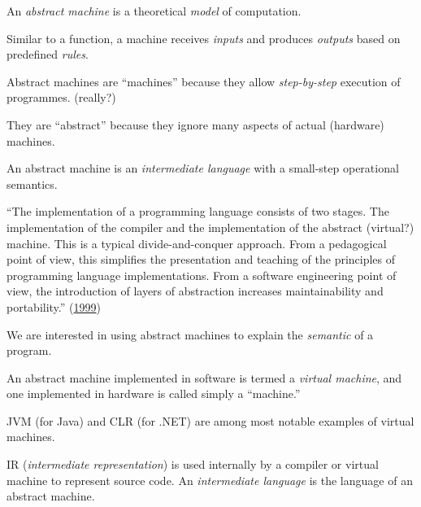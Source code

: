 \documentclass{article}
\begin{document}

\pptToc



An \emph{abstract machine} is a theoretical \emph{model} of computation.

Similar to a function, a machine receives \emph{inputs} and produces \emph{outputs} based on predefined \emph{rules}.

Abstract machines are ``machines'' because they allow \emph{step-by-step} execution of programmes. (really?)

They are ``abstract'' because they ignore many aspects of actual (hardware) machines.

An abstract machine is an \emph{intermediate language} with a small-step operational semantics.

\plush{}


``The implementation of a programming language consists of two
stages. The implementation of the compiler and the implementation of the abstract (virtual?) machine.
This is a typical divide-and-conquer approach.
From a pedagogical point of view, this simplifies the presentation and
teaching of the principles of programming language implementations.
From a software engineering point of view, the introduction of layers of
abstraction increases maintainability and portability.'' (\href{https://www.sciencedirect.com/science/article/abs/pii/S0167739X99000886}{1999})

We are interested in using abstract machines to explain the \emph{semantic} of a program.

\plush{}


An abstract machine implemented in software is termed a \emph{virtual machine},
and one implemented in hardware is called simply a ``machine.''

JVM (for Java) and CLR (for .NET) are among most notable examples of virtual machines.

IR (\emph{intermediate representation}) is used internally by a compiler or virtual machine to represent source code.
An \emph{intermediate language} is the language of an abstract machine.

\plush{}

\end{document}

